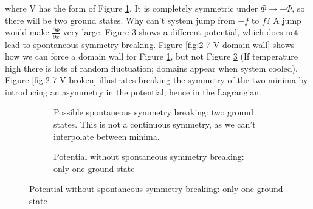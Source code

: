 \documentclass[]{article}
\begin{document}
where V has the form of Figure \ref{fig:2-7-V}. It is completely symmetric under $\Phi\rightarrow-\Phi$, so there will be two ground states. Why can't system jump from $-f$ to $f$? A jump would make $\frac{\partial \Phi}{\partial x}$ very large. Figure \ref{fig:2-7-V-simple} shows a different potential, which does not lead to spontaneous symmetry breaking. Figure \ref{fig:2-7-V-domain-wall} shows how we can force a domain wall for Figure \ref{fig:2-7-V}, but not Figure \ref{fig:2-7-V-simple} (If temperature high there is lots of random fluctuation; domains appear when system cooled).
Figure \ref{fig:2-7-V-broken} illustrates breaking the symmetry of the two minima by introducing an asymmetry in the potential, hence in the Lagrangian.
\begin{figure}[H]
	\caption[$V(\Phi)$ with and without spontaneous symmetry breaking]{Potential for (\ref{eq:spontaneous:symmetry:L}), with and without spontaneous symmetry breaking}
	\begin{subfigure}[t]{0.45\textwidth}
		\vskip 0pt
		\caption{Possible spontaneous symmetry breaking: two ground states. This is not a continuous symmetry, as we can't interpolate between minima.}\label{fig:2-7-V}
	\end{subfigure}
	\hfill
	\begin{subfigure}[t]{0.45\textwidth}
		\vskip 0pt
		\caption{Potential without spontaneous symmetry breaking: only one ground state}\label{fig:2-7-V-simple}
	\end{subfigure}
	

\end{figure}
\end{document}
